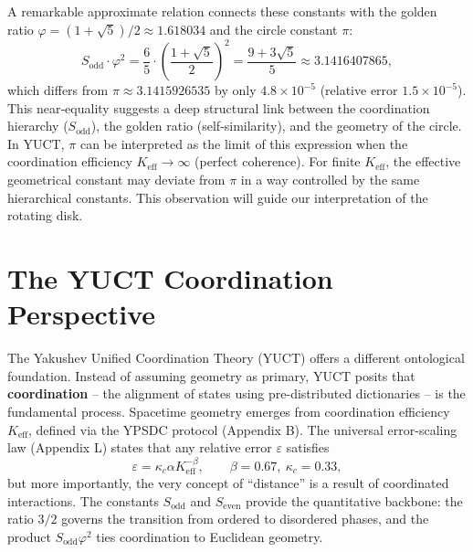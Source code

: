 \documentclass[12pt,a4paper]{article}
\newcommand{\kappac}{\kappa_c}
\newcommand{\eps}{\varepsilon}
\newcommand{\betaf}{\beta}
\newcommand{\Sodd}{S_{\mathrm{odd}}}
\newcommand{\Seven}{S_{\mathrm{even}}}
\begin{document}
	A remarkable approximate relation connects these constants with the golden ratio \(\varphi = (1+\sqrt{5})/2 \approx 1.618034\) and the circle constant \(\pi\):
	\begin{equation}
		\Sodd \cdot \varphi^2 = \frac{6}{5} \cdot \left(\frac{1+\sqrt{5}}{2}\right)^2 = \frac{9+3\sqrt{5}}{5} \approx 3.1416407865,
	\end{equation}
	which differs from \(\pi \approx 3.1415926535\) by only \(4.8\times10^{-5}\) (relative error \(1.5\times10^{-5}\)). This near‑equality suggests a deep structural link between the coordination hierarchy (\(\Sodd\)), the golden ratio (self‑similarity), and the geometry of the circle. In YUCT, \(\pi\) can be interpreted as the limit of this expression when the coordination efficiency \(K_{\mathrm{eff}} \to \infty\) (perfect coherence). For finite \(K_{\mathrm{eff}}\), the effective geometrical constant may deviate from \(\pi\) in a way controlled by the same hierarchical constants. This observation will guide our interpretation of the rotating disk.
	
	
	
	\section{The YUCT Coordination Perspective}
	\label{sec:yuct}
	

	
	The Yakushev Unified Coordination Theory (YUCT) offers a different ontological foundation. Instead of assuming geometry as primary, YUCT posits that \textbf{coordination} -- the alignment of states using pre-distributed dictionaries -- is the fundamental process. Spacetime geometry emerges from coordination efficiency \(K_{\mathrm{eff}}\), defined via the YPSDC protocol (Appendix B). The universal error-scaling law (Appendix L) states that any relative error \(\eps\) satisfies
	\[
	\eps = \kappac \alpha K_{\mathrm{eff}}^{-\betaf}, \qquad \betaf = 0.67,\ \kappac = 0.33,
	\]
	but more importantly, the very concept of ``distance'' is a result of coordinated interactions. The constants \(\Sodd\) and \(\Seven\) provide the quantitative backbone: the ratio \(3/2\) governs the transition from ordered to disordered phases, and the product \(\Sodd\varphi^2\) ties coordination to Euclidean geometry.
	
\end{document}
